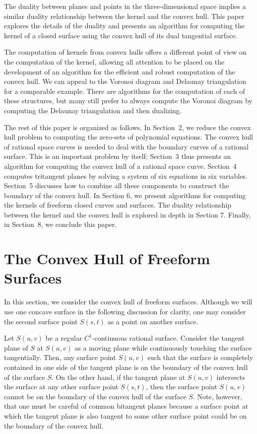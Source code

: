 \documentclass{elsart}
\begin{document}
The duality between planes and points in the three-dimensional space
implies a similar duality relationship between the kernel and
the convex hull.  This paper explores the details of the duality
and presents an algorithm for computing the kernel of a closed surface
using the convex hull of its dual tangential surface.

The computation of kernels from convex hulls offers a different point of
view on the computation of the kernel, allowing all attention
to be placed on the development of an algorithm
for the efficient and robust computation of the convex hull.
We can appeal to the Voronoi diagram and Delaunay triangulation
for a comparable example.  There are algorithms for the computation of
each of these structures, but many still prefer to always compute
the Voronoi diagram by computing the Delaunay triangulation and then dualizing.

The rest of this paper is organized as follows.
In Section~2, we reduce the convex hull problem to
computing the zero-sets of polynomial equations.
The convex hull of rational space curves is needed
to deal with the boundary curves of a rational surface.
This is an important problem by itself;
Section~3 thus presents an algorithm for computing
the convex hull of a rational space curve.
Section~4 computes tritangent planes by solving
a system of six equations in six variables.  
Section~5 discusses how to combine all these components
to construct the boundary of the convex hull.
In Section 6, we present algorithms for computing the kernels
of freeform closed curves and surfaces.
The duality relationship between the kernel and the convex hull
is explored in depth in Section 7.
Finally, in Section~8, we conclude this paper.

\section{The Convex Hull of Freeform Surfaces}
\label{sec-ch-surface}

In this section, we consider the convex hull of freeform surfaces.
Although we will use one concave surface in the following discussion
for clarity,  one may consider the second surface point $S(s,t)$
as a point on another surface.

Let $S(u,v)$ be a regular $C^1$-continuous rational surface. 
Consider the tangent plane of $S$ at $S(u,v)$ as a moving plane
while continuously touching the surface tangentially.
Then, any surface point $S(u,v)$
such that the surface is completely contained in one side of
the tangent plane is on the boundary of the convex hull of
the surface $S$. On the other hand, if the tangent plane at $S(u,v)$ 
intersects the surface at any other surface point $S(s,t)$, then
the surface point $S(u,v)$ cannot be on the boundary of
the convex hull of the surface $S$.
Note, however, that one must be careful of common bitangent planes because 
a surface point at which the tangent plane is also tangent to some
other surface point could be on the boundary of the convex hull. 
\end{document}
